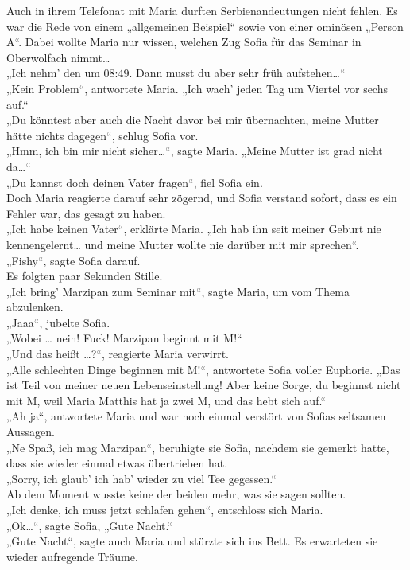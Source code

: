 \documentclass[oneside]{memoir}
\begin{document}
\bigskip
\noindent Auch in ihrem Telefonat mit Maria durften Serbienandeutungen nicht fehlen. Es war die Rede von einem „allgemeinen Beispiel“ sowie von einer ominösen „Person A“. Dabei wollte Maria nur wissen, welchen Zug Sofia für das Seminar in Oberwolfach nimmt\ldots \\
„Ich nehm' den um 08:49. Dann musst du aber sehr früh aufstehen\ldots“ \\
„Kein Problem“, antwortete Maria. „Ich wach' jeden Tag um Viertel vor sechs auf.“ \\
„Du könntest aber auch die Nacht davor bei mir übernachten, meine Mutter hätte nichts dagegen“, schlug Sofia vor. \\
„Hmm, ich bin mir nicht sicher\ldots“, sagte Maria. „Meine Mutter ist grad nicht da\ldots“ \\
„Du kannst doch deinen Vater fragen“, fiel Sofia ein. \\
Doch Maria reagierte darauf sehr zögernd, und Sofia verstand sofort, dass es ein Fehler war, das gesagt zu haben. \\
„Ich habe keinen Vater“, erklärte Maria. „Ich hab ihn seit meiner Geburt nie kennengelernt\ldots{} und meine Mutter wollte nie darüber mit mir sprechen“. \\
„Fishy“, sagte Sofia darauf. \\
Es folgten paar Sekunden Stille. \\
„Ich bring' Marzipan zum Seminar mit“,  sagte Maria, um vom Thema abzulenken. \\
„Jaaa“, jubelte Sofia. \\
„Wobei \ldots{} nein! Fuck! Marzipan beginnt mit M!“ \\
„Und das heißt \ldots?“, reagierte Maria verwirrt. \\
„Alle schlechten Dinge beginnen mit M!“, antwortete Sofia voller Euphorie. „Das ist Teil von meiner neuen Lebenseinstellung! Aber keine Sorge, du beginnst nicht mit M, weil Maria Matthis hat ja zwei M, und das hebt sich auf.“ \\
„Ah ja“, antwortete Maria und war noch einmal verstört von Sofias seltsamen Aussagen. \\
„Ne Spaß, ich mag Marzipan“, beruhigte sie Sofia, nachdem sie gemerkt hatte, dass sie wieder einmal etwas übertrieben hat. \\
„Sorry, ich glaub' ich hab' wieder zu viel Tee gegessen.“ \\
Ab dem Moment wusste keine der beiden mehr, was sie sagen sollten. \\
„Ich denke, ich muss jetzt schlafen gehen“, entschloss sich Maria. \\
„Ok\ldots“, sagte Sofia, „Gute Nacht.“ \\
„Gute Nacht“, sagte auch Maria und stürzte sich ins Bett. 
Es erwarteten sie wieder aufregende Träume.
\end{document}
